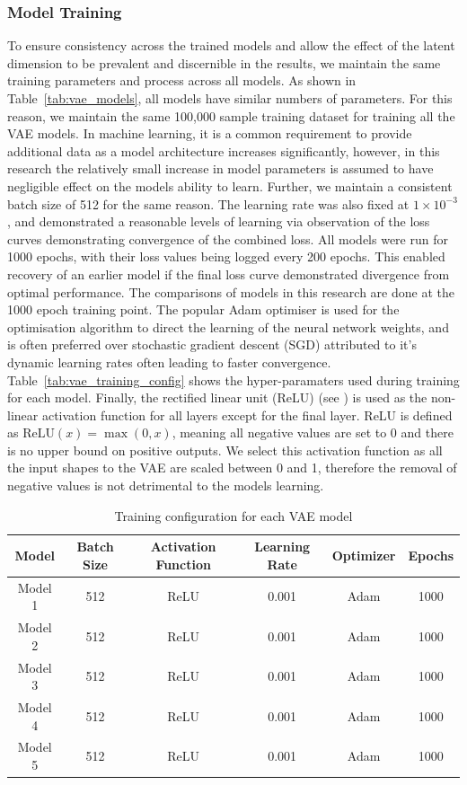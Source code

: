 \documentclass{article}
\begin{document}
\subsubsection{Model Training}
To ensure consistency across the trained models and allow the effect of the latent dimension to be prevalent and discernible in the results, we maintain the same training parameters and process across all models. As shown in Table~\ref{tab:vae_models}, all models have similar numbers of parameters. For this reason, we maintain the same 100,000 sample training dataset for training all the VAE models. In machine learning, it is a common requirement to provide additional data as a model architecture increases significantly, however, in this research the relatively small increase in model parameters is assumed to have negligible effect on the models ability to learn. Further, we maintain a consistent batch size of 512 for the same reason. The learning rate was also fixed at $1\times10^{-3}$, and demonstrated a reasonable levels of learning via observation of the loss curves demonstrating convergence of the combined loss. All models were run for 1000 epochs, with their loss values being logged every 200 epochs. This enabled recovery of an earlier model if the final loss curve demonstrated divergence from optimal performance. The comparisons of models in this research are done at the 1000 epoch training point. The popular Adam optimiser \citep{Kingma2014} is used for the optimisation algorithm to direct the learning of the neural network weights, and is often preferred over stochastic gradient descent (SGD) attributed to it's dynamic learning rates often leading to faster convergence. Table~\ref{tab:vae_training_config} shows the hyper-paramaters used during training for each model. Finally, the rectified linear unit (ReLU) (see \cite{FredAgarap2018}) is used as the non-linear activation function for all layers except for the final layer. ReLU is defined as $\text{ReLU}(x) = \max(0, x)$, meaning all negative values are set to 0 and there is no upper bound on positive outputs. We select this activation function as all the input shapes to the VAE are scaled between 0 and 1, therefore the removal of negative values is not detrimental to the models learning.

\begin{table}[h]
\centering
\begin{tabular}{|c|c|c|c|c|c|}
\hline
\textbf{Model} & \textbf{Batch Size} & \textbf{Activation Function} & \textbf{Learning Rate} & \textbf{Optimizer} & \textbf{Epochs} \\
\hline
Model 1 & 512 & ReLU & 0.001 & Adam & 1000 \\
\hline
Model 2 & 512 & ReLU & 0.001 & Adam & 1000 \\
\hline
Model 3 & 512 & ReLU & 0.001 & Adam & 1000 \\
\hline
Model 4 & 512 & ReLU & 0.001 & Adam & 1000 \\
\hline
Model 5 & 512 & ReLU & 0.001 & Adam & 1000 \\
\hline
\end{tabular}
\caption{Training configuration for each VAE model}
\label{tab:GA_models}
\end{table}
\end{document}
